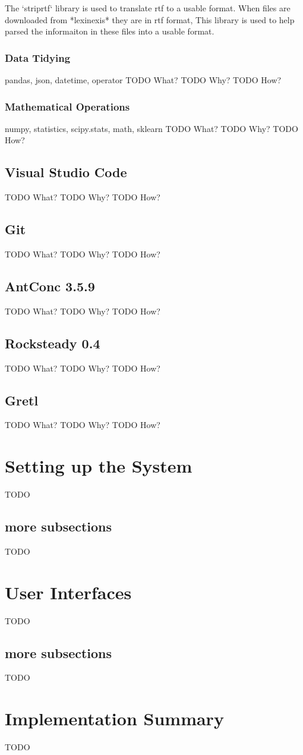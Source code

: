 The `striprtf` library is used to translate rtf to a usable format. When files are downloaded from *lexinexis* they are in rtf format, This library is used to help parsed the informaiton in these files into a usable format.

\subsubsection{Data Tidying}

pandas, json, datetime, operator
TODO What?
TODO Why?
TODO How?

\subsubsection{Mathematical Operations}

numpy, statistics, scipy.stats, math, sklearn
TODO What?
TODO Why?
TODO How?

\subsection{Visual Studio Code}

TODO What?
TODO Why?
TODO How?

\subsection{Git}

TODO What?
TODO Why?
TODO How?

\subsection{AntConc 3.5.9}

TODO What?
TODO Why?
TODO How?

\subsection{Rocksteady 0.4}

TODO What?
TODO Why?
TODO How?

\subsection{Gretl}

TODO What?
TODO Why?
TODO How?

\section{Setting up the System}
TODO
\subsection{more subsections}
TODO
\section{User Interfaces}
TODO
\subsection{more subsections}
TODO
\section{Implementation Summary}
TODO